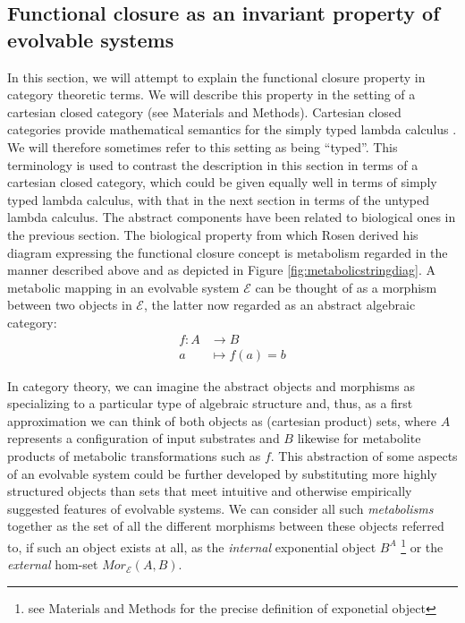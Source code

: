 \subsection*{Functional closure as an invariant property of evolvable systems}

In this section, we will attempt to explain the functional closure property in category theoretic terms. We will describe this property in the setting of a cartesian closed category (see Materials and Methods). Cartesian closed categories provide mathematical semantics for the simply typed lambda calculus \cite{Barendregt1985}. We will therefore sometimes refer to this setting as being ``typed''. This terminology is used to contrast the description in this section in terms of a cartesian closed category, which could be given equally well in terms of simply typed lambda calculus, with that in the next section in terms of the untyped lambda calculus. The abstract components have been related to biological ones in the previous section. The biological property from which Rosen derived his diagram expressing the functional closure concept is metabolism regarded in the manner described above and as depicted in Figure \ref{fig:metabolicstringdiag}. A metabolic mapping in an evolvable system $\mathcal{E}$ can be thought of as a morphism between two objects in $\mathcal{E}$, the latter now regarded as an abstract algebraic category:
\begin{align*}
f \colon A &\longrightarrow B\\
a &\longmapsto f(a)=b
\end{align*}

In category theory, we can imagine the abstract objects and morphisms as specializing to a particular type of algebraic structure and, thus, as a first approximation we can think of both objects as (cartesian product) sets, where $A$ represents a configuration of input substrates and $B$ likewise for metabolite products of metabolic transformations such as $f$. This abstraction of some aspects of an evolvable system could be further developed by substituting more highly structured objects than sets that meet intuitive and otherwise empirically suggested features of evolvable systems. We can consider all such \emph{metabolisms} together as the set of all the different morphisms between these objects referred to, if such an object exists at all, as the \emph{internal} exponential object $B^A$ \footnote{see Materials and Methods for the precise definition of exponetial object} or the \emph{external} hom-set $Mor_{\mathcal{E}}(A,B)$.

